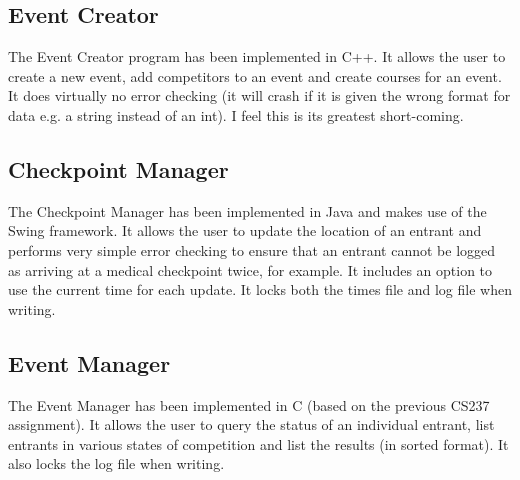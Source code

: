 \documentclass[a4paper, twoside]{article}
\begin{document}
\subsection{Event Creator}
The Event Creator program has been implemented in C++. It allows the user to
create a new event, add competitors to an event and create courses for an event.
It does virtually no error checking (it will crash if it is given the wrong
format for data e.g. a string instead of an int). I feel this is its greatest
short-coming.
\subsection{Checkpoint Manager}
The Checkpoint Manager has been implemented in Java and makes use of the Swing
framework. It allows the user to update the location of an entrant and performs
very simple error checking to ensure that an entrant cannot be logged as
arriving at a medical checkpoint twice, for example. It includes an option to
use the current time for each update. It locks both the times file and log file
when writing.
\subsection{Event Manager}
The Event Manager has been implemented in C (based on the previous CS237
assignment). It allows the user to query the status of an individual entrant,
list entrants in various states of competition and list the results (in sorted
format). It also locks the log file when writing.
\end{document}
